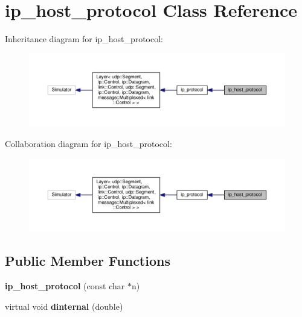\hypertarget{classip__host__protocol}{}\section{ip\+\_\+host\+\_\+protocol Class Reference}
\label{classip__host__protocol}


Inheritance diagram for ip\+\_\+host\+\_\+protocol\+:
\nopagebreak
\begin{figure}[H]
\begin{center}
\leavevmode
\includegraphics[width=350pt]{classip__host__protocol__inherit__graph}
\end{center}
\end{figure}


Collaboration diagram for ip\+\_\+host\+\_\+protocol\+:
\nopagebreak
\begin{figure}[H]
\begin{center}
\leavevmode
\includegraphics[width=350pt]{classip__host__protocol__coll__graph}
\end{center}
\end{figure}
\subsection*{Public Member Functions}
\begin{DoxyCompactItemize}
\item 
{\bfseries ip\+\_\+host\+\_\+protocol} (const char $\ast$n)\hypertarget{classip__host__protocol_a29412893a5845c69af6031eb6734e8c0}{}\label{classip__host__protocol_a29412893a5845c69af6031eb6734e8c0}

\item 
virtual void {\bfseries dinternal} (double)\hypertarget{classip__host__protocol_a2e2c43aeb81ae38702b7dec6f7df9227}{}\label{classip__host__protocol_a2e2c43aeb81ae38702b7dec6f7df9227}

\end{DoxyCompactItemize}

